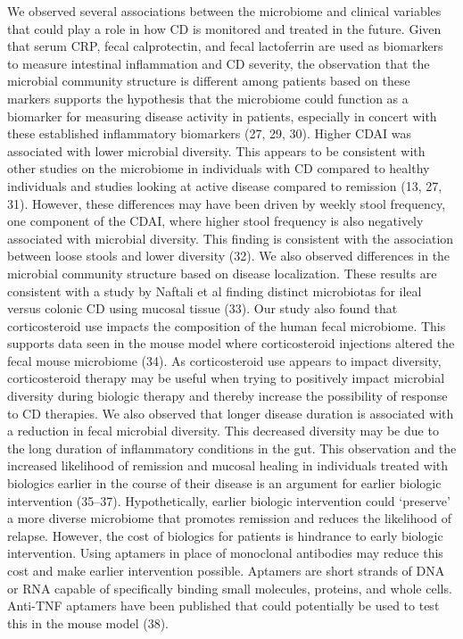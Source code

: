 \documentclass[11pt,]{article}
\begin{document}
We observed several associations between the microbiome and clinical
variables that could play a role in how CD is monitored and treated in
the future. Given that serum CRP, fecal calprotectin, and fecal
lactoferrin are used as biomarkers to measure intestinal inflammation
and CD severity, the observation that the microbial community structure
is different among patients based on these markers supports the
hypothesis that the microbiome could function as a biomarker for
measuring disease activity in patients, especially in concert with these
established inflammatory biomarkers (27, 29, 30). Higher CDAI was
associated with lower microbial diversity. This appears to be consistent
with other studies on the microbiome in individuals with CD compared to
healthy individuals and studies looking at active disease compared to
remission (13, 27, 31). However, these differences may have been driven
by weekly stool frequency, one component of the CDAI, where higher stool
frequency is also negatively associated with microbial diversity. This
finding is consistent with the association between loose stools and
lower diversity (32). We also observed differences in the microbial
community structure based on disease localization. These results are
consistent with a study by Naftali et al finding distinct microbiotas
for ileal versus colonic CD using mucosal tissue (33). Our study also
found that corticosteroid use impacts the composition of the human fecal
microbiome. This supports data seen in the mouse model where
corticosteroid injections altered the fecal mouse microbiome (34). As
corticosteroid use appears to impact diversity, corticosteroid therapy
may be useful when trying to positively impact microbial diversity
during biologic therapy and thereby increase the possibility of response
to CD therapies. We also observed that longer disease duration is
associated with a reduction in fecal microbial diversity. This decreased
diversity may be due to the long duration of inflammatory conditions in
the gut. This observation and the increased likelihood of remission and
mucosal healing in individuals treated with biologics earlier in the
course of their disease is an argument for earlier biologic intervention
(35--37). Hypothetically, earlier biologic intervention could `preserve'
a more diverse microbiome that promotes remission and reduces the
likelihood of relapse. However, the cost of biologics for patients is
hindrance to early biologic intervention. Using aptamers in place of
monoclonal antibodies may reduce this cost and make earlier intervention
possible. Aptamers are short strands of DNA or RNA capable of
specifically binding small molecules, proteins, and whole cells.
Anti-TNF aptamers have been published that could potentially be used to
test this in the mouse model (38).
\end{document}
